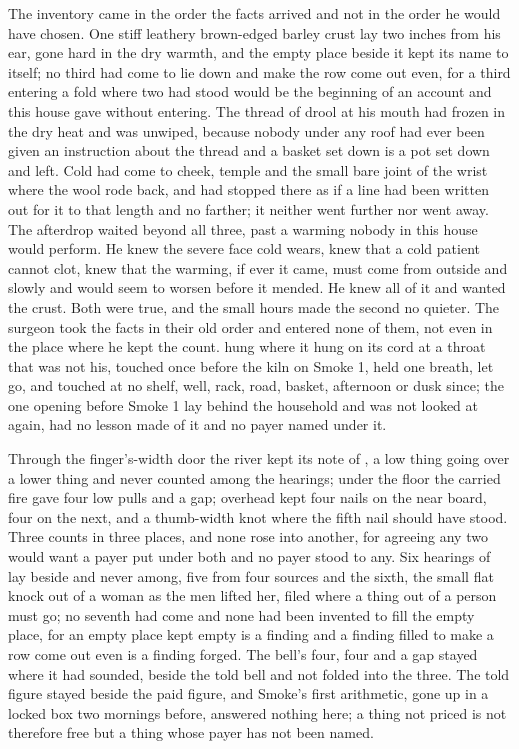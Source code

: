 The inventory came in the order the facts arrived and not in the order he would have chosen. One stiff leathery brown-edged barley crust lay two inches from his ear, gone hard in the dry warmth, and the empty place beside it kept its name to itself; no third had come to lie down and make the row come out even, for a third entering a fold where two had stood would be the beginning of an account and this house gave without entering. The thread of drool at his mouth had frozen in the dry heat and was unwiped, because nobody under any roof had ever been given an instruction about the thread and a basket set down is a pot set down and left. Cold had come to cheek, temple and the small bare joint of the wrist where the wool rode back, and had stopped there as if a line had been written out for it to that length and no farther; it neither went further nor went away. The afterdrop waited beyond all three, past a warming nobody in this house would perform. He knew the severe face cold wears, knew that a cold patient cannot clot, knew that the warming, if ever it came, must come from outside and slowly and would seem to worsen before it mended. He knew all of it and wanted the crust. Both were true, and the small hours made the second no quieter. The surgeon took the facts in their old order and entered none of them, not even in the place where he kept the count.  hung where it hung on its cord at a throat that was not his, touched once before the kiln on Smoke 1, held one breath, let go, and touched at no shelf, well, rack, road, basket, afternoon or dusk since; the one opening before Smoke 1 lay behind the household and was not looked at again, had no lesson made of it and no payer named under it.

Through the finger's-width door the river kept its note of , a low thing going over a lower thing and never counted among the hearings; under the floor the carried fire gave four low pulls and a gap; overhead  kept four nails on the near board, four on the next, and a thumb-width knot where the fifth nail should have stood. Three counts in three places, and none rose into another, for agreeing any two would want a payer put under both and no payer stood to any. Six hearings of  lay beside and never among, five from four sources and the sixth, the small flat knock out of a woman as the men lifted her, filed where a thing out of a person must go; no seventh had come and none had been invented to fill the empty place, for an empty place kept empty is a finding and a finding filled to make a row come out even is a finding forged. The bell's four, four and a gap stayed where it had sounded, beside the told bell and not folded into the three. The told figure stayed beside the paid figure, and Smoke's first arithmetic, gone up  in a locked box two mornings before, answered nothing here; a thing not priced is not therefore free but a thing whose payer has not been named.

